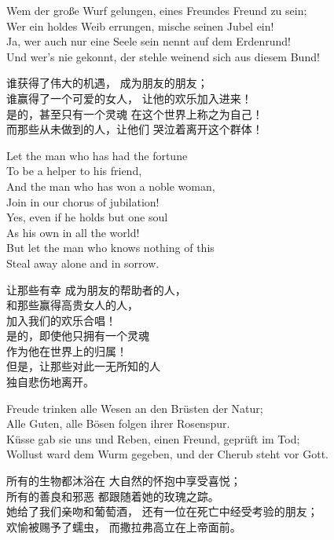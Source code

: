 \begin{paracol}{4}
\begin{Gverse}
Wem der gro{\ss}e Wurf gelungen,
eines Freundes Freund zu sein;\\
Wer ein holdes Weib errungen,
mische seinen Jubel ein!\\
Ja, wer auch nur eine Seele 
sein nennt auf dem Erdenrund!\\
Und wer's nie gekonnt, der stehle 
weinend sich aus diesem Bund! 
\end{Gverse}
\begin{CGverse}
谁获得了伟大的机遇，
成为朋友的朋友；\\
谁赢得了一个可爱的女人，
让他的欢乐加入进来！\\
是的，甚至只有一个灵魂
在这个世界上称之为自己！\\
而那些从未做到的人，让他们
哭泣着离开这个群体！
\end{CGverse}
\begin{Everse}
Let the man who has had the fortune\\
To be a helper to his friend,\\
And the man who has won a noble woman,\\
Join in our chorus of jubilation!\\
Yes, even if he holds but one soul\\
As his own in all the world!\\
But let the man who knows nothing of this\\
Steal away alone and in sorrow.
\end{Everse}
\begin{CEverse}
让那些有幸
成为朋友的帮助者的人，\\
和那些赢得高贵女人的人，\\
加入我们的欢乐合唱！\\
是的，即使他只拥有一个灵魂\\
作为他在世界上的归属！\\
但是，让那些对此一无所知的人\\
独自悲伤地离开。
\end{CEverse}

\begin{Gverse}
Freude trinken alle Wesen
an den Br\"usten der Natur;\\
Alle Guten, alle B\"osen
folgen ihrer Rosenspur.\\
K\"usse gab sie uns und Reben,
einen Freund, gepr\"uft im Tod;\\
Wollust ward dem Wurm gegeben,
und der Cherub steht vor Gott. 
\end{Gverse}
\begin{CGverse}
所有的生物都沐浴在
大自然的怀抱中享受喜悦；\\
所有的善良和邪恶
都跟随着她的玫瑰之踪。\\
她给了我们亲吻和葡萄酒，
还有一位在死亡中经受考验的朋友；\\
欢愉被赐予了蠕虫，
而撒拉弗高立在上帝面前。
\end{CGverse}


\end{paracol}
